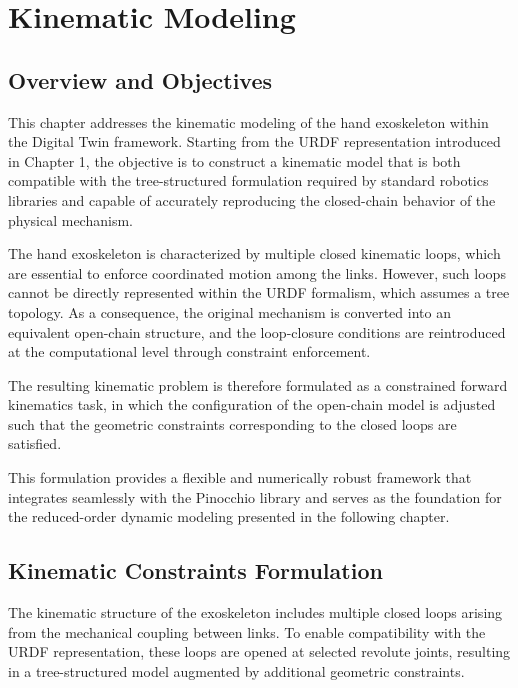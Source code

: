 \chapter{Kinematic Modeling}
\section{Overview and Objectives}

This chapter addresses the kinematic modeling of the hand exoskeleton within the Digital Twin framework. Starting from the URDF representation introduced in Chapter 1, the objective is to construct a kinematic model that is both compatible with the tree-structured formulation required by standard robotics libraries and capable of accurately reproducing the closed-chain behavior of the physical mechanism.

The hand exoskeleton is characterized by multiple closed kinematic loops, which are essential to enforce coordinated motion among the links. However, such loops cannot be directly represented within the URDF formalism, which assumes a tree topology. As a consequence, the original mechanism is converted into an equivalent open-chain structure, and the loop-closure conditions are reintroduced at the computational level through constraint enforcement.

The resulting kinematic problem is therefore formulated as a constrained forward kinematics task, in which the configuration of the open-chain model is adjusted such that the geometric constraints corresponding to the closed loops are satisfied.

This formulation provides a flexible and numerically robust framework that integrates seamlessly with the Pinocchio\cite{carpentier2019pinocchio} library and serves as the foundation for the reduced-order dynamic modeling presented in the following chapter.




\section{Kinematic Constraints Formulation}

The kinematic structure of the exoskeleton includes multiple closed loops arising from the mechanical coupling between links. To enable compatibility with the URDF representation, these loops are opened at selected revolute joints, resulting in a tree-structured model augmented by additional geometric constraints.

